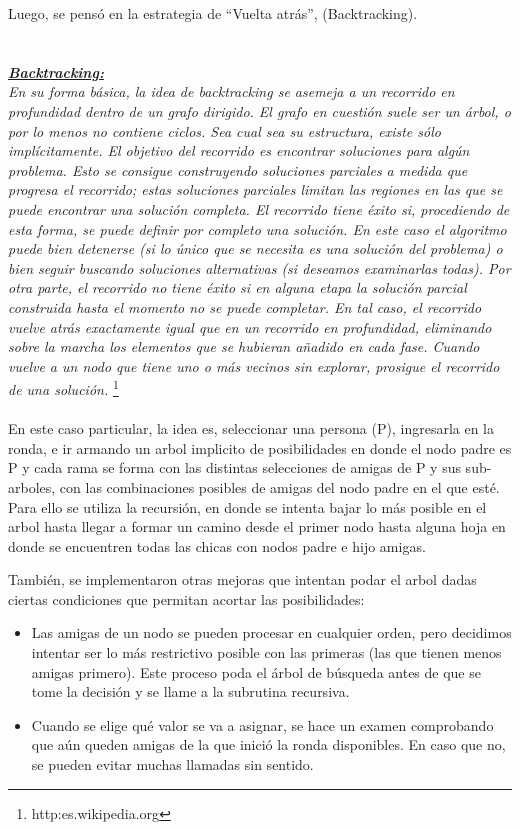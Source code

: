 	Luego, se pensó en la estrategia de ``Vuelta atrás'', (Backtracking).
\\ \\ \\
\textit{
\underline{\textbf{Backtracking:}}\\
En su forma básica, la idea de backtracking se asemeja a un recorrido en profundidad dentro de un grafo dirigido. El grafo en cuestión suele ser un árbol, o por lo menos no contiene ciclos. Sea cual sea su estructura, existe sólo implícitamente. El objetivo del recorrido es encontrar soluciones para algún problema. Esto se consigue construyendo soluciones parciales a medida que progresa el recorrido; estas soluciones parciales limitan las regiones en las que se puede encontrar una solución completa. El recorrido tiene éxito si, procediendo de esta forma, se puede definir por completo una solución. En este caso el algoritmo puede bien detenerse (si lo único que se necesita es una solución del problema) o bien seguir buscando soluciones alternativas (si deseamos examinarlas todas). Por otra parte, el recorrido no tiene éxito si en alguna etapa la solución parcial construida hasta el momento no se puede completar. En tal caso, el recorrido vuelve atrás exactamente igual que en un recorrido en profundidad, eliminando sobre la marcha los elementos que se hubieran añadido en cada fase. Cuando vuelve a un nodo que tiene uno o más vecinos sin explorar, prosigue el recorrido de una solución.
}\footnote{http:\/\/es.wikipedia.org\/}
\\ \\

En este caso particular, la idea es, seleccionar una persona (P), ingresarla en la ronda, e ir armando un arbol implicito de posibilidades en donde
el nodo padre es P y cada rama se forma con las distintas selecciones de amigas de P y sus sub-arboles, con las combinaciones posibles de amigas del nodo padre en el que esté.
Para ello se utiliza la recursión, en donde se intenta bajar lo más posible en el arbol hasta llegar a formar un camino desde el primer nodo hasta alguna hoja en donde se encuentren
todas las chicas con nodos padre e hijo amigas.

También, se implementaron otras mejoras que intentan podar el arbol dadas ciertas condiciones que permitan acortar las posibilidades:
\begin{itemize}
 \item Las amigas de un nodo se pueden procesar en cualquier orden, pero decidimos intentar ser lo más restrictivo posible con las primeras (las que tienen menos amigas primero). Este proceso poda el árbol de búsqueda antes de que se tome la decisión y se llame a la subrutina recursiva.
 \item Cuando se elige qué valor se va a asignar, se hace un examen comprobando que aún queden amigas de la que inició la ronda disponibles. En caso que no, se pueden evitar muchas llamadas sin sentido.
\end{itemize}

